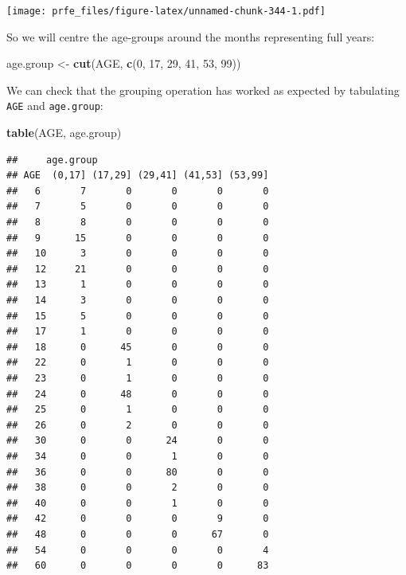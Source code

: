 \documentclass[12pt,]{book}
\newenvironment{Shaded}{\begin{snugshade}}{\end{snugshade}}
\newcommand{\KeywordTok}[1]{\textcolor[rgb]{0.13,0.29,0.53}{\textbf{#1}}}
\newcommand{\DecValTok}[1]{\textcolor[rgb]{0.00,0.00,0.81}{#1}}
\newcommand{\StringTok}[1]{\textcolor[rgb]{0.31,0.60,0.02}{#1}}
\newcommand{\NormalTok}[1]{#1}
\theoremstyle{definition}
\theoremstyle{definition}
\theoremstyle{definition}
\theoremstyle{remark}
\begin{document}
\texttt{[image: prfe\_files/figure-latex/unnamed-chunk-344-1.pdf]}

So we will centre the age-groups around the months representing full
years:

\begin{Shaded}
\begin{Highlighting}[]
\NormalTok{age.group <-}\StringTok{ }\KeywordTok{cut}\NormalTok{(AGE, }\KeywordTok{c}\NormalTok{(}\DecValTok{0}\NormalTok{, }\DecValTok{17}\NormalTok{, }\DecValTok{29}\NormalTok{, }\DecValTok{41}\NormalTok{, }\DecValTok{53}\NormalTok{, }\DecValTok{99}\NormalTok{))}
\end{Highlighting}
\end{Shaded}

We can check that the grouping operation has worked as expected by
tabulating \texttt{AGE} and \texttt{age.group}:

\begin{Shaded}
\begin{Highlighting}[]
\KeywordTok{table}\NormalTok{(AGE, age.group)}
\end{Highlighting}
\end{Shaded}

\begin{verbatim}
##     age.group
## AGE  (0,17] (17,29] (29,41] (41,53] (53,99]
##   6       7       0       0       0       0
##   7       5       0       0       0       0
##   8       8       0       0       0       0
##   9      15       0       0       0       0
##   10      3       0       0       0       0
##   12     21       0       0       0       0
##   13      1       0       0       0       0
##   14      3       0       0       0       0
##   15      5       0       0       0       0
##   17      1       0       0       0       0
##   18      0      45       0       0       0
##   22      0       1       0       0       0
##   23      0       1       0       0       0
##   24      0      48       0       0       0
##   25      0       1       0       0       0
##   26      0       2       0       0       0
##   30      0       0      24       0       0
##   34      0       0       1       0       0
##   36      0       0      80       0       0
##   38      0       0       2       0       0
##   40      0       0       1       0       0
##   42      0       0       0       9       0
##   48      0       0       0      67       0
##   54      0       0       0       0       4
##   60      0       0       0       0      83
\end{verbatim}
\end{document}
